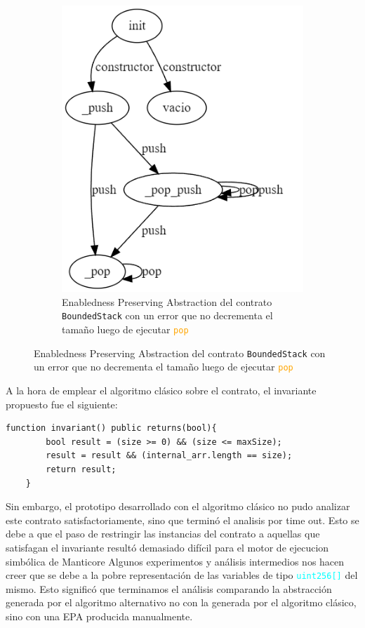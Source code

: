 \begin{figure}[H]
    \centering
    \begin{subfigure}{0.45\textwidth}
        \includegraphics[width=\textwidth]{figs/buggy-bounded-stack-epa.png}
        \caption{Enabledness Preserving Abstraction del contrato \texttt{BoundedStack} con un error que no decrementa el tamaño luego de ejecutar \textcolor{orange}{\texttt{pop}} }
        \label{fig:buggy-bounded-stack-epa}
    \end{subfigure}
\end{figure}

A la hora de emplear el algoritmo clásico sobre el contrato, el invariante propuesto fue el siguiente:
\begin{lstlisting}[language=Solidity]
    function invariant() public returns(bool){
        bool result = (size >= 0) && (size <= maxSize);
        result = result && (internal_arr.length == size);
        return result;
    }
\end{lstlisting}

Sin embargo, el prototipo desarrollado con el algoritmo clásico no pudo analizar este contrato satisfactoriamente, sino que terminó el analisis por time out.
Esto se debe a que el paso de restringir las instancias del contrato a aquellas que satisfagan el invariante resultó demasiado difícil para el motor de ejecucion simbólica de Manticore
Algunos experimentos y análisis intermedios nos hacen creer que se debe a la pobre representación de las variables de tipo \textcolor{cyan}{\texttt{uint256[]}} del mismo.
Esto significó que terminamos el análisis comparando la abstracción generada por el algoritmo alternativo no con la generada por el algoritmo clásico, sino con una EPA producida manualmente.

